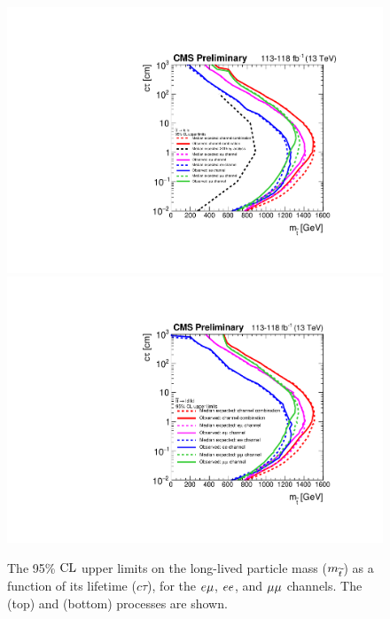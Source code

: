 \begin{figure}[hbtp]
\centering
\includegraphics[scale=0.45]{figures/results/2DlimitsStopToLB.pdf}
\includegraphics[scale=0.45]{figures/results/2DlimitsStopToLD.pdf}
\caption{The 95\% $\text{CL}$ upper limits on the long-lived particle mass ($m_{\widetilde{t}}$) as a function of its lifetime ($c\tau$), for the $e{\mu}$, $ee$, and ${\mu}{\mu}$ channels. The \stoptolb (top) and \stoptold (bottom) processes are shown.} 
\label{limits_individual}
\end{figure}

